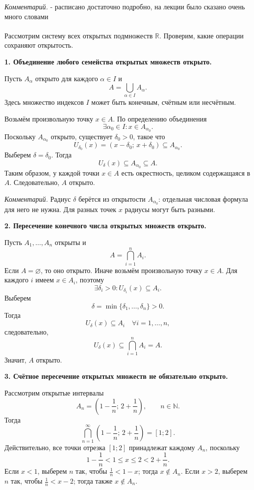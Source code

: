 \begin{example}
    \textit{Комментарий.} - расписано достаточно подробно, на лекции было сказано очень много словами
    \\
    \\
    Рассмотрим систему всех открытых подмножеств $\mathbb{R}$.
    Проверим, какие операции сохраняют открытость.

    \textbf{1. Объединение любого семейства открытых множеств открыто.}

    Пусть $A_\alpha$ открыто для каждого $\alpha \in I$ и
    \[
        A = \bigcup_{\alpha \in I} A_\alpha.
    \]
    Здесь множество индексов $I$ может быть конечным,
    счётным или несчётным.

    Возьмём произвольную точку $x \in A$.
    По определению объединения
    \[
        \exists \alpha_0 \in I \colon x \in A_{\alpha_0}.
    \]
    Поскольку $A_{\alpha_0}$ открыто, существует $\delta_0 > 0$,
    такое что
    \[
        U_{\delta_0}(x)
        =
        (x-\delta_0;\,x+\delta_0)
        \subseteq A_{\alpha_0}.
    \]
    Выберем $\delta = \delta_0$. Тогда
    \[
        U_\delta(x) \subseteq A_{\alpha_0} \subseteq A.
    \]
    Таким образом, у каждой точки $x \in A$ есть окрестность,
    целиком содержащаяся в $A$. Следовательно, $A$ открыто.

    \textit{Комментарий.}
    Радиус $\delta$ берётся из открытости $A_{\alpha_0}$:
    отдельная числовая формула для него не нужна.
    Для разных точек $x$ радиусы могут быть разными.

    \medskip
    \textbf{2. Пересечение конечного числа открытых множеств открыто.}

    Пусть $A_1,\dots,A_n$ открыты и
    \[
        A = \bigcap_{i=1}^{n} A_i.
    \]
    Если $A = \varnothing$, то оно открыто.
    Иначе возьмём произвольную точку $x \in A$.
    Для каждого $i$ имеем $x \in A_i$, поэтому
    \[
        \exists \delta_i > 0 \colon
        U_{\delta_i}(x) \subseteq A_i.
    \]
    Выберем
    \[
        \delta = \min\{\delta_1,\dots,\delta_n\} > 0.
    \]
    Тогда
    \[
        U_\delta(x) \subseteq A_i
        \quad \forall i=1,\dots,n,
    \]
    следовательно,
    \[
        U_\delta(x) \subseteq \bigcap_{i=1}^{n} A_i = A.
    \]
    Значит, $A$ открыто.

    \medskip
    \textbf{3. Счётное пересечение открытых множеств
    не обязательно открыто.}

    Рассмотрим открытые интервалы
    \[
        A_n = \left(1-\frac{1}{n};\,2+\frac{1}{n}\right),
        \qquad n \in \mathbb{N}.
    \]
    Тогда
    \[
        \bigcap_{n=1}^{\infty}
        \left(1-\frac{1}{n};\,2+\frac{1}{n}\right)
        =
        [1;2].
    \]
    Действительно, все точки отрезка $[1;2]$ принадлежат
    каждому $A_n$, поскольку
    \[
        1-\frac{1}{n} < 1 \leq x \leq 2 < 2+\frac{1}{n}.
    \]
    Если $x < 1$, выберем $n$ так, чтобы $\frac{1}{n} < 1-x$;
    тогда $x \notin A_n$.
    Если $x > 2$, выберем $n$ так, чтобы $\frac{1}{n} < x-2$;
    тогда также $x \notin A_n$.


\end{example}
